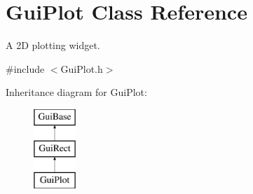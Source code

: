 \hypertarget{class_gui_plot}{\section{Gui\-Plot Class Reference}
\label{class_gui_plot}
}


A 2\-D plotting widget.  




{\ttfamily \#include $<$Gui\-Plot.\-h$>$}

Inheritance diagram for Gui\-Plot\-:\begin{figure}[H]
\begin{center}
\leavevmode
\includegraphics[height=3.000000cm]{class_gui_plot}
\end{center}
\end{figure}
